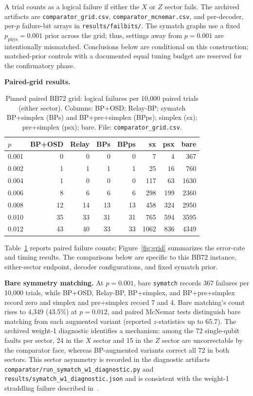 \documentclass[pdflatex,sn-mathphys-num]{sn-jnl}
\theoremstyle{thmstyleone}
\theoremstyle{thmstyletwo}
\theoremstyle{thmstylethree}
\begin{document}
A trial counts as a logical failure if either the $X$ or $Z$ sector fails. The archived artifacts are \texttt{comparator\_grid.csv}, \texttt{comparator\_mcnemar.csv}, and per-decoder, per-$p$ failure-bit arrays in \texttt{results/failbits/}. The symatch graphs use a fixed $p_{\mathrm{phys}}=0.001$ prior across the grid; thus, settings away from $p=0.001$ are intentionally mismatched. Conclusions below are conditional on this construction; matched-prior controls with a documented equal tuning budget are reserved for the confirmatory phase.

\noindent\textbf{Paired-grid results.}\par

\begin{table}[!htbp]
\center
\caption{Pinned paired BB72 grid: logical failures per 10{,}000 paired trials (either sector). Columns: BP+OSD; Relay-BP; symatch BP+simplex (BPs) and BP+pre+simplex (BPps); simplex (sx); pre+simplex (psx); bare. File: \texttt{comparator\_grid.csv}.}
\label{tab:grid}
\begin{tabular}{@{}lrrrrrrr@{}}
\toprule
$p$ & BP+OSD & Relay & BPs & BPps & sx & psx & bare \\\midrule
0.001 & 0 & 0 & 0 & 0 & 7 & 4 & 367 \\
0.002 & 1 & 1 & 1 & 1 & 25 & 16 & 760 \\
0.004 & 1 & 0 & 0 & 0 & 117 & 63 & 1630 \\
0.006 & 8 & 6 & 6 & 6 & 298 & 199 & 2360 \\
0.008 & 12 & 14 & 13 & 13 & 458 & 324 & 2950 \\
0.010 & 35 & 33 & 31 & 31 & 765 & 594 & 3595 \\
0.012 & 43 & 40 & 33 & 33 & 1062 & 836 & 4349 \\
\bottomrule
\end{tabular}
\end{table}

Table~\ref{tab:grid} reports paired failure counts; Figure~\ref{fig:grid} summarizes the error-rate and timing results. The comparisons below are specific to this BB72 instance, either-sector endpoint, decoder configurations, and fixed symatch prior.

\noindent\textbf{Bare symmetry matching.} At $p=0.001$, bare \texttt{symatch} records 367 failures per 10{,}000 trials, while BP+OSD, Relay-BP, BP+simplex, and BP+pre+simplex record zero and simplex and pre+simplex record 7 and 4. Bare matching's count rises to 4{,}349 (43.5\%) at $p=0.012$, and paired McNemar tests distinguish bare matching from each augmented variant (reported $z$-statistics up to 65.7). The archived weight-1 diagnostic identifies a mechanism: among the 72 single-qubit faults per sector, 24 in the $X$ sector and 15 in the $Z$ sector are uncorrectable by the comparator face, whereas BP-augmented variants correct all 72 in both sectors. This sector asymmetry is recorded in the diagnostic artifacts \texttt{comparator/\allowbreak run\_symatch\_w1\_diagnostic.py} and \texttt{results/\allowbreak symatch\_w1\_diagnostic.json} and is consistent with the weight-1 straddling failure described in~\cite{SahayBrown2026}.
\end{document}
